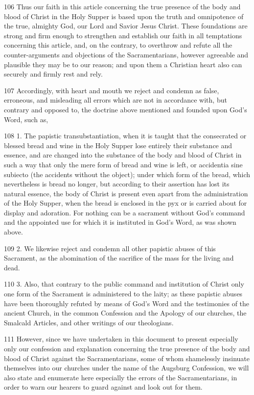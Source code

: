 106 Thus our faith in this article concerning the true presence of the body and blood of Christ in the Holy Supper is based upon the truth and omnipotence of the true, almighty God, our Lord and Savior Jesus Christ. These foundations are strong and firm enough to strengthen and establish our faith in all temptations concerning this article, and, on the contrary, to overthrow and refute all the counter-arguments and objections of the Sacramentarians, however agreeable and plausible they may be to our reason; and upon them a Christian heart also can securely and firmly rest and rely.

107 Accordingly, with heart and mouth we reject and condemn as false, erroneous, and misleading all errors which are not in accordance with, but contrary and opposed to, the doctrine above mentioned and founded upon God’s Word, such as,

108 1. The papistic transubstantiation, when it is taught that the consecrated or blessed bread and wine in the Holy Supper lose entirely their substance and essence, and are changed into the substance of the body and blood of Christ in such a way that only the mere form of bread and wine is left, or accidentia sine subiecto (the accidents without the object); under which form of the bread, which nevertheless is bread no longer, but according to their assertion has lost its natural essence, the body of Christ is present even apart from the administration of the Holy Supper, when the bread is enclosed in the pyx or is carried about for display and adoration. For nothing can be a sacrament without God’s command and the appointed use for which it is instituted in God’s Word, as was shown above.

109 2. We likewise reject and condemn all other papistic abuses of this Sacrament, as the abomination of the sacrifice of the mass for the living and dead.

110 3. Also, that contrary to the public command and institution of Christ only one form of the Sacrament is administered to the laity; as these papistic abuses have been thoroughly refuted by means of God’s Word and the testimonies of the ancient Church, in the common Confession and the Apology of our churches, the Smalcald Articles, and other writings of our theologians.

111 However, since we have undertaken in this document to present especially only our confession and explanation concerning the true presence of the body and blood of Christ against the Sacramentarians, some of whom shamelessly insinuate themselves into our churches under the name of the Augsburg Confession, we will also state and enumerate here especially the errors of the Sacramentarians, in order to warn our hearers to guard against and look out for them.

